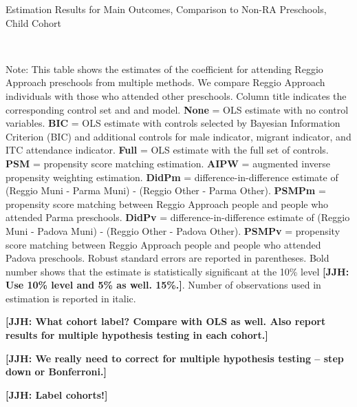 

\begin{table}[H] \caption{Estimation Results for Main Outcomes, Comparison to Non-RA Preschools, Child Cohort} \label{ols-M-child-reg-pres}
\scalebox{0.7}{}
\vspace{1ex} \\
\footnotesize\raggedright{Note: This table shows the estimates of the coefficient for attending Reggio Approach preschools from multiple methods. We compare Reggio Approach individuals with those who attended other preschools. Column title indicates the corresponding control set and and model. \textbf{None} = OLS estimate with no control variables. \textbf{BIC} = OLS estimate with controls selected by Bayesian Information Criterion (BIC) and additional controls for male indicator, migrant indicator, and ITC attendance indicator. \textbf{Full} = OLS estimate with the full set of controls. \textbf{PSM} =  propensity score matching estimation. \textbf{AIPW} = augmented inverse propensity weighting estimation. \textbf{DidPm} = difference-in-difference estimate of (Reggio Muni - Parma Muni) - (Reggio Other - Parma Other). \textbf{PSMPm} = propensity score matching between Reggio Approach people and people who attended Parma preschools. \textbf{DidPv} = difference-in-difference estimate of (Reggio Muni - Padova Muni) - (Reggio Other - Padova Other). \textbf{PSMPv} = propensity score matching between Reggio Approach people and people who attended Padova preschools. Robust standard errors are reported in parentheses. Bold number shows that the estimate is statistically significant at the 10\% level \textbf{[JJH: Use 10\% level and 5\% as well. 15\%.]}. Number of observations used in estimation is reported in italic.}

\end{table}

\textbf{[JJH: What cohort label? Compare with OLS as well. Also report results for multiple hypothesis testing in each cohort.]}

\textbf{[JJH: We really need to correct for multiple hypothesis testing -- step down or Bonferroni.]}

\textbf{[JJH: Label cohorts!]}


